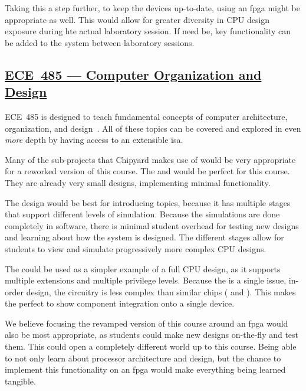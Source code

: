 Taking this a step further, to keep the devices up-to-date, using an \Gls{fpga} might be appropriate as well.
This would allow for greater diversity in CPU design exposure during hte actual laboratory session.
If need be, key functionality can be added to the system between laboratory sessions.

\subsection{\href{http://bulletin.iit.edu/search/?P=ECE 485}{ECE~485 --- Computer Organization and Design}}\label{sec:ECE_485}
ECE~485 is designed to teach fundamental concepts of computer architecture, organization, and design~\cite{iitECE485}.
All of these topics can be covered and explored in even \emph{more} depth by having access to an \gls{extensible} \Gls{isa}.

Many of the sub-projects that Chipyard makes use of would be very appropriate for a reworked version of this course.
The  and  would be perfect for this course.
They are already very small designs, implementing minimal functionality.

The  design would be best for introducing topics, because it has multiple stages that support different levels of simulation.
Because the simulations are done completely in software, there is minimal student overhead for testing new designs and learning about how the system is designed.
The different stages allow for students to view and simulate progressively more complex CPU designs.

The  could be used as a simpler example of a full CPU design, as it supports multiple extensions and multiple privilege levels.
Because the  is a single issue, in-order design, the circuitry is less complex than similar chips ( and ).
This makes the  perfect to show component integration onto a single device.

We believe focusing the revamped version of this course around an \Gls{fpga} would also be most appropriate, as students could make new designs on-the-fly and test them.
This could open a completely different world up to this course.
Being able to not only learn about processor architecture and design, but the chance to implement this functionality on an \Gls{fpga} would make everything being learned tangible.

